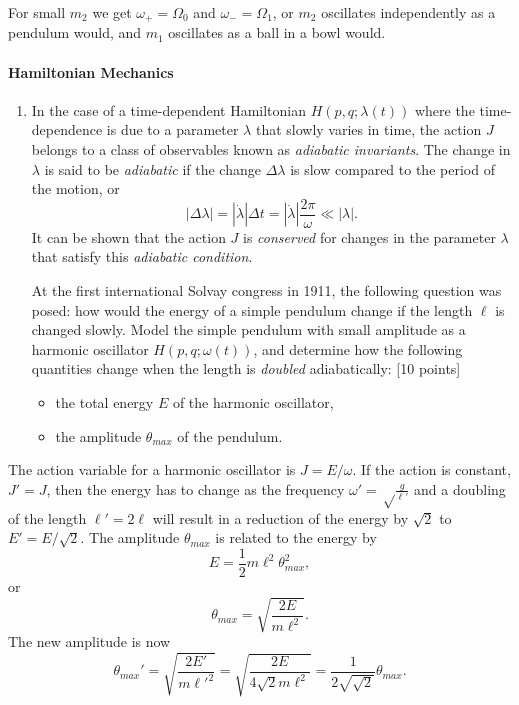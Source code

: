 \documentclass[letterpaper,11pt]{article}
\begin{document}
For small $m_2$ we get $\omega_+ = \Omega_0$ and $\omega_- = \Omega_1$, or $m_2$ oscillates independently as a pendulum would, and $m_1$ oscillates as a ball in a bowl would.


\paragraph*{Hamiltonian Mechanics}
\begin{enumerate}[resume]
 \item In the case of a time-dependent Hamiltonian $H\left(p,q;\lambda(t)\right)$ where the time-dependence is due to a parameter $\lambda$ that slowly varies in time, the action $J$ belongs to a class of observables known as \emph{adiabatic invariants}.  The change in $\lambda$ is said to be \emph{adiabatic} if the change $\Delta\lambda$ is slow compared to the period of the motion, or
 \begin{equation*}
  |\Delta\lambda| = |\dot\lambda| \Delta t = |\dot\lambda| \frac{2\pi}{\omega} \ll |\lambda|.
 \end{equation*}
 It can be shown that the action $J$ is \emph{conserved} for changes in the parameter $\lambda$ that satisfy this \emph{adiabatic condition}.

 At the first international Solvay congress in 1911, the following question was posed: how would the energy of a simple pendulum change if the length $\ell$ is changed slowly.  Model the simple pendulum with small amplitude as a harmonic oscillator $H\left(p,q;\omega(t)\right)$, and determine how the following quantities change when the length is \emph{doubled} adiabatically: [10 points]
 \begin{itemize}
  \item the total energy $E$ of the harmonic oscillator,
  \item the amplitude $\theta_{max}$ of the pendulum.
 \end{itemize}
\end{enumerate}

The action variable for a harmonic oscillator is $J = E/\omega$.  If the action is constant, $J' = J$, then the energy has to change as the frequency $\omega' = \sqrt\frac{g}{\ell'}$ and a doubling of the length $\ell' = 2 \ell$ will result in a reduction of the energy by $\sqrt{2}$ to $E' = E / \sqrt{2}$.  The amplitude $\theta_{max}$ is related to the energy by
\begin{equation*}
 E = \frac{1}{2} m\ell^2\theta_{max}^2,
\end{equation*}
or
\begin{equation*}
 \theta_{max} = \sqrt{\frac{2 E}{m\ell^2}}.
\end{equation*}
The new amplitude is now
\begin{equation*}
 \theta_{max}' = \sqrt{\frac{2 E'}{m\ell'^2}} = \sqrt{\frac{2 E}{4\sqrt{2}m\ell^2}} = \frac{1}{2\sqrt{\sqrt{2}}} \theta_{max}.
\end{equation*}
\end{document}

